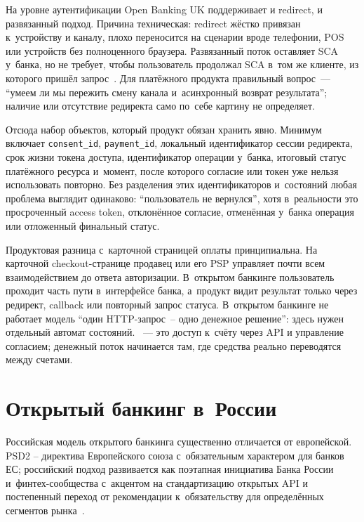 На уровне аутентификации Open Banking UK поддерживает и redirect,
и развязанный подход. Причина техническая: redirect жёстко привязан
к~устройству и каналу, плохо переносится на сценарии вроде телефонии,
POS или устройств без полноценного браузера. Развязанный поток
оставляет SCA у~банка, но не требует, чтобы пользователь продолжал
SCA в~том же клиенте, из которого пришёл
запрос~\cite{openbanking-uk-authentication-methods}. Для платёжного
продукта правильный вопрос~--- \enquote{умеем ли мы пережить смену
канала и~асинхронный возврат результата}; наличие или отсутствие
редиректа само по~себе картину не определяет.

Отсюда набор объектов, который продукт обязан хранить явно. Минимум
включает \texttt{consent\_id}, \texttt{payment\_id}, локальный
идентификатор сессии редиректа, срок жизни токена доступа,
идентификатор операции у~банка, итоговый статус платёжного ресурса
и~момент, после которого согласие или токен уже нельзя использовать
повторно. Без разделения этих идентификаторов и~состояний любая проблема выглядит
одинаково: \enquote{пользователь не вернулся}, хотя в~реальности это
просроченный access token, отклонённое согласие, отменённая
у~банка операция или отложенный финальный статус.

Продуктовая разница с~карточной страницей оплаты принципиальна.
На карточной checkout-странице продавец или его PSP управляет почти
всем взаимодействием до ответа авторизации. В~открытом банкинге
пользователь проходит часть пути в~интерфейсе банка, а~продукт видит
результат только через редирект, callback или повторный запрос
статуса. В~открытом банкинге не работает модель \enquote{один
HTTP-запрос~-- одно денежное решение}: здесь нужен отдельный автомат
состояний. ~---
это доступ к~счёту через API и управление согласием; денежный поток
начинается там, где средства реально переводятся между счетами.

\section{Открытый банкинг в~России}\label{sec:open-banking-russia}

Российская модель открытого банкинга существенно отличается
от европейской. PSD2 -- директива Европейского союза с~обязательным
характером для банков ЕС; российский подход развивается как
поэтапная инициатива Банка России и~финтех-сообщества с~акцентом
на стандартизацию открытых API и постепенный переход
от рекомендации к~обязательству для определённых
сегментов рынка~\cite{cbr-open-api,afe-open-api}.

